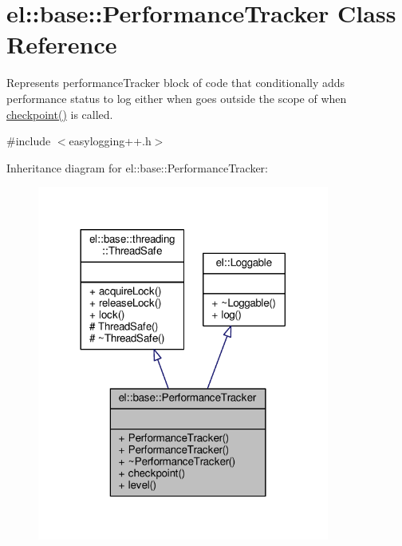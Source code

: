 \hypertarget{classel_1_1base_1_1PerformanceTracker}{}\section{el\+:\+:base\+:\+:Performance\+Tracker Class Reference}
\label{classel_1_1base_1_1PerformanceTracker}


Represents performance\+Tracker block of code that conditionally adds performance status to log either when goes outside the scope of when \hyperlink{classel_1_1base_1_1PerformanceTracker_aec9a6e149674c5782cc855e49aeb0aaf}{checkpoint()} is called.  




{\ttfamily \#include $<$easylogging++.\+h$>$}



Inheritance diagram for el\+:\+:base\+:\+:Performance\+Tracker\+:
\nopagebreak
\begin{figure}[H]
\begin{center}
\leavevmode
\includegraphics[width=272pt]{d6/d73/classel_1_1base_1_1PerformanceTracker__inherit__graph}
\end{center}
\end{figure}


